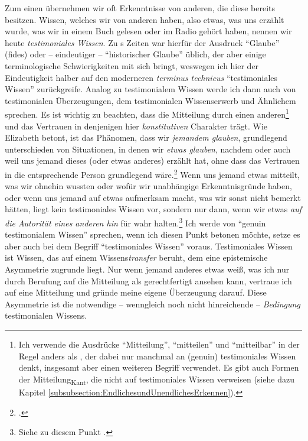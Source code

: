 \begin{nummerierung}
\item Zum einen übernehmen wir oft Erkenntnisse von anderen, die diese bereits
besitzen. Wissen, welches wir von anderen haben, also etwas, was uns erzählt
wurde, was wir in einem Buch gelesen oder im Radio gehört haben, nennen wir
heute \emph{testimoniales Wissen}. Zu s Zeiten war hierfür
der Ausdruck \enquote{Glaube} (fides) oder -- eindeutiger --
\enquote{historischer Glaube} üblich, der aber einige terminologische
Schwierigkeiten mit sich bringt, weswegen ich hier der Eindeutigkeit halber auf
den moderneren \emph{terminus technicus} \enquote{testimoniales Wissen}
zurückgreife. Analog zu testimonialem Wissen werde ich dann auch von
testimonialen Überzeugungen, dem testimonialen Wissenserwerb und Ähnlichem
sprechen. Es ist wichtig zu beachten, dass die Mitteilung durch einen
anderen\footnote{Ich verwende die Ausdrücke \enquote{Mitteilung},
\enquote{mitteilen} und \enquote{mitteilbar} in der Regel anders als
, der dabei nur manchmal an (genuin) testimoniales Wissen denkt,
insgesamt aber einen weiteren Begriff verwendet. Es gibt auch Formen der
Mitteilung\textsubscript{Kant}, die nicht auf testimoniales Wissen
verweisen (siehe dazu Kapitel
\ref{subsubsection:EndlichesundUnendlichesErkennen}).} und das Vertrauen in
denjenigen hier \emph{konstitutiven} Charakter trägt. Wie Elizabeth
 betont, ist das Phänomen, dass wir
\emph{jemandem glauben}, grundlegend unterschieden von Situationen, in denen wir
\emph{etwas glauben}, nachdem oder auch weil uns jemand dieses (oder etwas
anderes) erzählt hat, ohne dass das Vertrauen in die entsprechende Person
grundlegend wäre.\footcite[Vgl.][4]{Anscombe:WhatIsIttoBelieveSomeone2008} Wenn
uns jemand etwas mitteilt, was wir ohnehin wussten oder wofür wir unabhängige
Erkenntnisgründe haben, oder wenn uns jemand auf etwas aufmerksam macht, was wir
sonst nicht bemerkt hätten, liegt kein testimoniales Wissen vor, sondern nur
dann, wenn wir etwas \emph{auf die Autorität eines anderen hin} für wahr
halten.\footnote{Siehe zu diesem Punkt
\cite[][398--400]{Hawley:TestimonyandKnowingHow2010}.} Ich werde von
\enquote{genuin testimonialem Wissen} sprechen, wenn ich diesen Punkt betonen
möchte, setze es aber auch bei dem Begriff \enquote{testimoniales Wissen}
voraus. Testimoniales Wissen ist Wissen, das auf einem Wissens\emph{transfer}
beruht, dem eine epistemische Asymmetrie zugrunde liegt. Nur wenn jemand
anderes etwas weiß, was ich nur durch Berufung auf die Mitteilung als
gerechtfertigt ansehen kann, vertraue ich auf eine Mitteilung und gründe meine
eigene Überzeugung darauf. Diese Asymmetrie ist die notwendige -- wenngleich
noch nicht hinreichende -- \emph{Bedingung} testimonialen Wissens.


\end{nummerierung}
